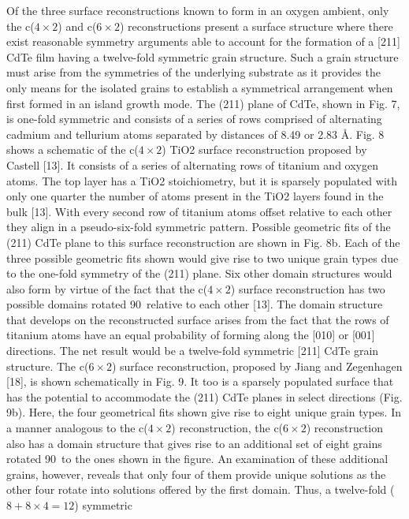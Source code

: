 Of the three surface reconstructions known to form in an
oxygen ambient, only the c($4\times2$) and c($6\times2$) reconstructions
present a surface structure where there exist reasonable symmetry
arguments able to account for the formation of a [211] CdTe film
having a twelve-fold symmetric grain structure. Such a grain
structure must arise from the symmetries of the underlying
substrate as it provides the only means for the isolated grains to
establish a symmetrical arrangement when first formed in an
island growth mode. The (211) plane of CdTe, shown in Fig. 7, is
one-fold symmetric and consists of a series of rows comprised of
alternating cadmium and tellurium atoms separated by distances of 8.49 or 2.83 \AA. Fig. 8 shows a schematic of the c($4\times2$) TiO2 surface reconstruction proposed by Castell [13]. It consists of a
series of alternating rows of titanium and oxygen atoms. The top
layer has a TiO2 stoichiometry, but it is sparsely populated with
only one quarter the number of atoms present in the TiO2 layers
found in the bulk [13]. With every second row of titanium atoms
offset relative to each other they align in a pseudo-six-fold
symmetric pattern. Possible geometric fits of the (211) CdTe plane
to this surface reconstruction are shown in Fig. 8b. Each of the three
possible geometric fits shown would give rise to two unique grain
types due to the one-fold symmetry of the (211) plane. Six other
domain structures would also form by virtue of the fact that the
c($4\times2$) surface reconstruction has two possible domains rotated
90\degree~relative to each other [13]. The domain structure that develops
on the reconstructed surface arises from the fact that the rows of
titanium atoms have an equal probability of forming along the
[010] or [001] directions. The net result would be a twelve-fold
symmetric [211] CdTe grain structure. The c($6\times2$) surface
reconstruction, proposed by Jiang and Zegenhagen [18], is shown
schematically in Fig. 9. It too is a sparsely populated surface that
has the potential to accommodate the (211) CdTe planes in select
directions (Fig. 9b). Here, the four geometrical fits shown give rise
to eight unique grain types. In a manner analogous to the c($4\times2$)
reconstruction, the c($6\times2$) reconstruction also has a domain
structure that gives rise to an additional set of eight grains rotated
90\degree~to the ones shown in the figure. An examination of these
additional grains, however, reveals that only four of them provide
unique solutions as the other four rotate into solutions offered by
the first domain. Thus, a twelve-fold ($8 + 8 \times 4 = 12$) symmetric
